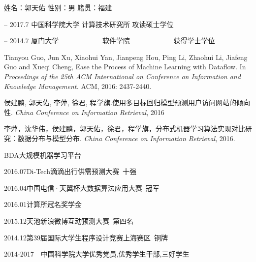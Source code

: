 \begin{resume}

\newcommand\tab[1][1cm]{\hspace*{#1}}

\noindent
\begin{center}
姓名：郭天佑 \tab 性别：男 \tab  籍贯：福建\\
\end{center}

 -- 2017.7  \tab  中国科学院大学 \tab 计算技术研究所 \tab  攻读硕士学位

 -- 2014.7   \tab 厦门大学~~~~~~~~~~~~  \tab 软件学院~~~~~~~~~~~~ \tab  获得学士学位

  \begin{enumerate}[{[}1{]}]
\item Tianyou Guo, Jun Xu, Xiaohui Yan, Jianpeng Hou, Ping Li, Zhaohui Li, Jiafeng Guo and Xueqi Cheng, Ease the Process of Machine Learning with Dataflow. 
In \emph{Proceedings of the 25th ACM International on Conference on Information and Knowledge Management.} ACM, 2016: 2437-2440. 

\item 侯建鹏, 郭天佑, 李萍, 徐君, 程学旗.使用多目标回归模型预测用户访问网站的倾向性. \emph{China Conference on Information Retrieval}, 2016 

\item 李萍，沈华伟，侯建鹏，郭天佑，徐君，程学旗，分布式机器学习算法实现对比研究：数据分布与模型分布. \emph{ China Conference on Information Retrieval}, 2016.
\end{enumerate}

\begin{enumerate}[{[}1{]}]
\item BDA大规模机器学习平台
\end{enumerate}


  \begin{enumerate}[{[}1{]}]
\item 2016.07\quad Di-Tech滴滴出行供需预测大赛~十强
\item 2016.04\quad 中国电信·天翼杯大数据算法应用大赛~冠军
\item 2016.01\quad 计算所冠名奖学金
\item 2015.12\quad 天池新浪微博互动预测大赛~第四名
\item 2014.12\quad 第39届国际大学生程序设计竞赛上海赛区~铜牌
\item 2014-2017~~中国科学院大学优秀党员,优秀学生干部,三好学生
  \end{enumerate}
\end{resume}
